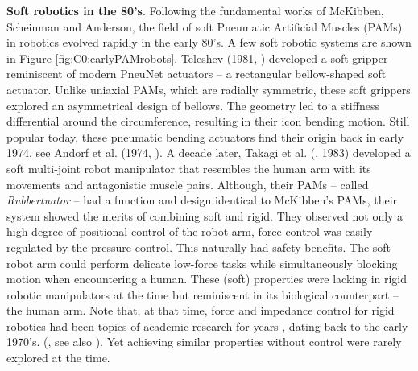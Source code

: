 \textbf{Soft robotics in the 80's}. Following the fundamental works of McKibben, Scheinman and Anderson, the field of soft Pneumatic Artificial Muscles (PAMs) in robotics evolved rapidly in the early 80's. A few soft robotic systems are shown in Figure \ref{fig:C0:earlyPAMrobots}. Teleshev (1981, \cite{Teleshev1981}) developed a soft gripper reminiscent of modern PneuNet actuators \cite{Galloway2016,Mosadegh2014,Choi2011} -- a rectangular bellow-shaped soft actuator. Unlike uniaxial PAMs, which are radially symmetric, these soft grippers explored an asymmetrical design of bellows. The geometry led to a stiffness differential around the circumference, resulting in their icon bending motion. Still popular today, these pneumatic bending actuators find their origin back in early 1974, see Andorf et al. (1974, \cite{Andorf1974}). A decade later, Takagi et al. (\cite{Takagi1983}, 1983) developed a soft multi-joint robot manipulator that resembles the human arm with its movements and antagonistic muscle pairs. Although, their PAMs -- called \textit{Rubbertuator} -- had a function and design identical to McKibben's PAMs, their system showed the merits of combining soft and rigid. They observed not only a high-degree of positional control of the robot arm, force control was easily regulated by the pressure control. This naturally had safety benefits. The soft robot arm could perform delicate low-force tasks while simultaneously blocking motion when encountering a human. These (soft) properties were lacking in rigid robotic manipulators at the time but reminiscent in its biological counterpart -- the human arm. Note that, at that time, force and impedance control for rigid robotics had been topics of academic research for years \cite{Anderson1988,Khatib1987,Hogan1984,Hogan1984Jan}, dating back to the early 1970's. (\eg, see also \cite{Markiewicz1973}). Yet achieving similar properties without control were rarely explored at the time.
%
